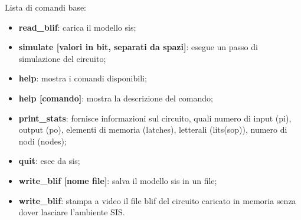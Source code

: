\documentclass[a4paper]{article}
\theoremstyle{break}
\theoremstyle{break}
\theoremstyle{break}
\theoremstyle{break}
\begin{document}
Lista di comandi base:
\begin{itemize}
    \item \textbf{read\_blif}: carica il modello sis;
    \item \textbf{simulate [valori in bit, separati da spazi]}: esegue un passo di
        simulazione del circuito;
    \item \textbf{help}: mostra i comandi disponibili;
    \item \textbf{help [comando]}: mostra la descrizione del comando;
    \item \textbf{print\_stats}: fornisce informazioni sul circuito, quali numero di input
       (pi), output (po), elementi di memoria (latches), letterali (lits(sop)), numero di nodi (nodes);
    \item \textbf{quit}: esce da sis;
    \item \textbf{write\_blif [nome file]}: salva il modello sis in un file;
    \item \textbf{write\_blif}: stampa a video il file blif del circuito caricato in memoria
        senza dover lasciare l'ambiente SIS.
\end{itemize}
\end{document}
